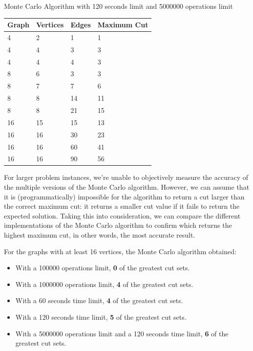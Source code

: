 \documentclass[]{revdetua}
\begin{document}
\begin{table}[!ht]
    \centering
    Monte Carlo Algorithm with 120 seconds limit  and 5000000 operations limit
    \begin{tabular}{|l|l|l|l|}
    \hline
        Graph & Vertices & Edges & Maximum Cut \\ \hline
        4 & 2 & 1 & 1 \\ \hline
        4 & 4 & 3 & 3 \\ \hline
        4 & 4 & 4 & 3 \\ \hline
        8 & 6 & 3 & 3 \\ \hline
        8 & 7 & 7 & 6 \\ \hline
        8 & 8 & 14 & 11 \\ \hline
        8 & 8 & 21 & 15 \\ \hline
        16 & 15 & 15 & 13 \\ \hline
        16 & 16 & 30 & 23 \\ \hline
        16 & 16 & 60 & 41 \\ \hline
        16 & 16 & 90 & 56 \\ \hline
    \end{tabular}
\end{table}

\pagebreak

For larger problem instances, we're unable to objectively measure the accuracy of the multiple versions of the Monte Carlo algorithm. However, we can assume that it is (programmatically) impossible for the algorithm to return a cut larger than the correct maximum cut: it returns a smaller cut value if it fails to return the expected solution. Taking this into consideration, we can compare the different implementations of the Monte Carlo algorithm to confirm which returns the highest maximum cut, in other words, the most accurate result.

For the graphs with at least 16 vertices, the Monte Carlo algorithm obtained:
\begin{itemize}
\item With a 100000 operations limit, \textbf{0} of the greatest cut sets.
\item With a 1000000 operations limit, \textbf{4} of the greatest cut sets. 
\item With a 60 seconds time limit,  \textbf{4} of the greatest cut sets. 
\item With a 120 seconds time limit,  \textbf{5} of the greatest cut sets. 
\item With a 5000000 operations limit and a 120 seconds time limit, \textbf{6} of the greatest cut sets.
\end{itemize}
\end{document}
